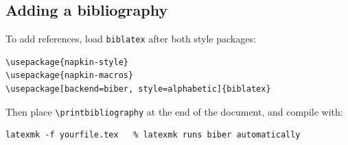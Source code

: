 \documentclass[11pt]{scrartcl}
\begin{document}
\subsection{Adding a bibliography}

To add references, load \texttt{biblatex} after both style packages:
\begin{verbatim}
\usepackage{napkin-style}
\usepackage{napkin-macros}
\usepackage[backend=biber, style=alphabetic]{biblatex}

\end{verbatim}
Then place \verb|\printbibliography| at the end of the document, and
compile with:
\begin{verbatim}
latexmk -f yourfile.tex   % latexmk runs biber automatically
\end{verbatim}
\end{document}
